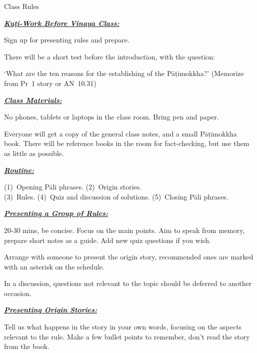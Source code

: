 \documentclass[11pt]{article}
\newcommand\subSectionFmt[1]{%
  {%
  \normalfont%
  \bfseries\itshape%
  \uline{#1}%
  }%
}
\begin{document}

{\LARGE Class Rules}

\begin{multicols}{2}

\subSectionFmt{Kuṭi-Work Before Vinaya Class:}

Sign up for presenting rules and prepare.

There will be a short test before the introduction, with the question:

`What are the ten reasons for the establishing of the Pāṭimokkha?' (Memorize from Pr~1 story or AN~10.31)

\subSectionFmt{Class Materials:}

No phones, tablets or laptops in the class room. Bring pen and paper.

Everyone will get a copy of the general class notes, and a small Pāṭimokkha book. There will be reference books in the room for fact-checking, but use them as little as possible.

\columnbreak

\subSectionFmt{Routine:}

(1)~Opening Pāli phrases. (2)~Origin stories.\\
(3)~Rules. (4)~Quiz and discussion of solutions. (5)~Closing Pāli phrases.

\subSectionFmt{Presenting a Group of Rules:}

20-30 mins, be concise. Focus on the main points.
Aim to speak from memory, prepare short notes as a guide.
Add new quiz questions if you wish.

Arrange with someone to present the origin story, recommended ones are marked with an asterisk on the schedule.

In a discussion, questions not relevant to the topic should be deferred to another occasion.

\subSectionFmt{Presenting Origin Stories:}

Tell us what happens in the story in your own words, focusing on the aspects relevant to the rule. Make a few bullet points to remember, don't read the story from the book.

\end{multicols}
\end{document}
